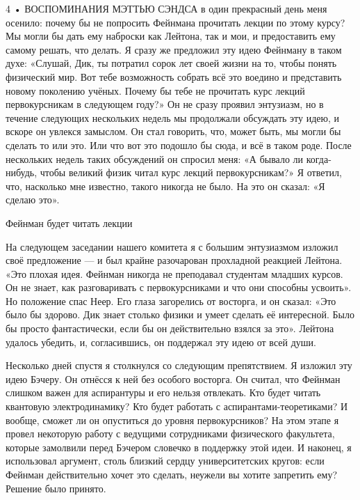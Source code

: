 \documentclass[10pt,oneside]{article}
\begin{document}
4 • ВОСПОМИНАНИЯ МЭТТЬЮ СЭНДСА в один прекрасный день меня осенило: почему бы не попросить Фейнмана прочитать лекции по этому курсу? Мы могли бы дать ему наброски как Лейтона, так и мои, и предоставить ему самому решать, что делать. Я сразу же предложил эту идею Фейнману в таком духе: «Слушай, Дик, ты потратил сорок лет своей жизни на то, чтобы понять физический мир. Вот тебе возможность собрать всё это воедино и представить новому поколению учёных. Почему бы тебе не прочитать курс лекций первокурсникам в следующем году?» Он не сразу проявил энтузиазм, но в течение следующих нескольких недель мы продолжали обсуждать эту идею, и вскоре он увлекся замыслом. Он стал говорить, что, может быть, мы могли бы сделать то или это. Или что вот это подошло бы сюда, и всё в таком роде. После нескольких недель таких обсуждений он спросил меня: «А бывало ли когда-нибудь, чтобы великий физик читал курс лекций первокурсникам?» Я ответил, что, насколько мне известно, такого никогда не было. На это он сказал: «Я сделаю это».\par

Фейнман будет читать лекции\par

На следующем заседании нашего комитета я с большим энтузиазмом изложил своё предложение --- и был крайне разочарован прохладной реакцией Лейтона. «Это плохая идея. Фейнман никогда не преподавал студентам младших курсов. Он не знает, как разговаривать с первокурсниками и что они способны усвоить». Но положение спас Неер. Его глаза загорелись от восторга, и он сказал: «Это было бы здорово. Дик знает столько физики и умеет сделать её интересной. Было бы просто фантастически, если бы он действительно взялся за это». Лейтона удалось убедить, и, согласившись, он поддержал эту идею от всей души.\par

Несколько дней спустя я столкнулся со следующим препятствием. Я изложил эту идею Бэчеру. Он отнёсся к ней без особого восторга. Он считал, что Фейнман слишком важен для аспирантуры и его нельзя отвлекать. Кто будет читать квантовую электродинамику? Кто будет работать с аспирантами-теоретиками? И вообще, сможет ли он опуститься до уровня первокурсников? На этом этапе я провел некоторую работу с ведущими сотрудниками физического факультета, которые замолвили перед Бэчером словечко в поддержку этой идеи. И наконец, я использовал аргумент, столь близкий сердцу университетских кругов: если Фейнман действительно хочет это сделать, неужели вы хотите запретить ему? Решение было принято.\par
\end{document}
